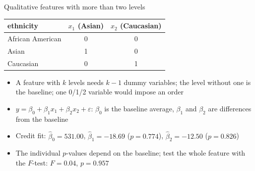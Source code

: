 \begin{frame}{Qualitative features with more than two levels}
    \begin{center}
        \small
        \begin{tabular}{lcc}
            \toprule
            ethnicity & $x_1$ (Asian) & $x_2$ (Caucasian) \\
            \midrule
            African American & 0 & 0 \\
            Asian & 1 & 0 \\
            Caucasian & 0 & 1 \\
            \bottomrule
        \end{tabular}
    \end{center}
    \begin{itemize}
        \item A feature with $k$ levels needs $k-1$ dummy variables; the level without one is the baseline; one 0/1/2 variable would impose an order
        \item $y = \beta_0 + \beta_1 x_1 + \beta_2 x_2 + \varepsilon$: $\beta_0$ is the baseline average, $\beta_1$ and $\beta_2$ are differences from the baseline
        \item Credit fit: $\hat\beta_0 = 531.00$, $\hat\beta_1 = -18.69$ ($p = 0.774$), $\hat\beta_2 = -12.50$ ($p = 0.826$)
        \item The individual $p$-values depend on the baseline; test the whole feature with the $F$-test: $F = 0.04$, $p = 0.957$
    \end{itemize}
\end{frame}


